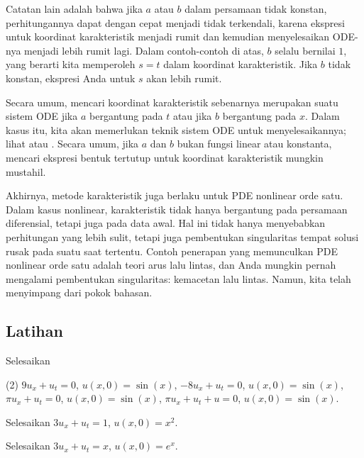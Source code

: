 Catatan lain adalah bahwa jika $a$ atau $b$ dalam persamaan tidak konstan,
perhitungannya dapat
dengan cepat menjadi tidak terkendali, karena ekspresi untuk koordinat
karakteristik menjadi rumit dan kemudian menyelesaikan ODE-nya menjadi lebih rumit lagi.
Dalam contoh-contoh di atas, $b$ selalu bernilai $1$, yang berarti kita memperoleh $s=t$ dalam
koordinat karakteristik.  Jika $b$ tidak konstan, ekspresi Anda untuk $s$
akan lebih rumit.

Secara umum, mencari koordinat karakteristik sebenarnya
merupakan suatu sistem ODE jika $a$ bergantung pada $t$ atau jika $b$ bergantung pada $x$.
Dalam kasus itu, kita akan memerlukan teknik sistem ODE
untuk menyelesaikannya; lihat  atau .  Secara
umum, jika $a$ dan $b$ bukan fungsi linear atau konstanta, mencari
ekspresi bentuk tertutup untuk koordinat karakteristik mungkin mustahil.

Akhirnya, metode karakteristik juga berlaku untuk PDE
nonlinear orde satu.
Dalam kasus nonlinear, karakteristik tidak hanya bergantung
pada persamaan diferensial, tetapi juga pada data awal.  Hal ini tidak hanya menyebabkan
perhitungan yang lebih sulit, tetapi juga pembentukan
singularitas tempat solusi rusak pada suatu saat tertentu.
Contoh penerapan yang memunculkan PDE nonlinear orde satu
adalah teori arus lalu lintas, dan Anda mungkin pernah mengalami
pembentukan singularitas: kemacetan lalu lintas.  Namun, kita telah menyimpang dari pokok bahasan.

\subsection{Latihan}

\begin{exercise}
Selesaikan
\begin{tasks}(2)
\task $9u_x + u_t = 0$, \enspace $u(x,0) = \sin(x)$,
\task $-8u_x + u_t = 0$, \enspace $u(x,0) = \sin(x)$,
\task $\pi u_x + u_t = 0$, \enspace $u(x,0) = \sin(x)$,
\task $\pi u_x + u_t + u = 0$, \enspace $u(x,0) = \sin(x)$.
\end{tasks}
\end{exercise}

\begin{exercise}
Selesaikan $3u_x + u_t = 1$, $u(x,0) = x^2$.
\end{exercise}

\begin{exercise}
Selesaikan $3u_x + u_t = x$, $u(x,0) = e^x$.
\end{exercise}

